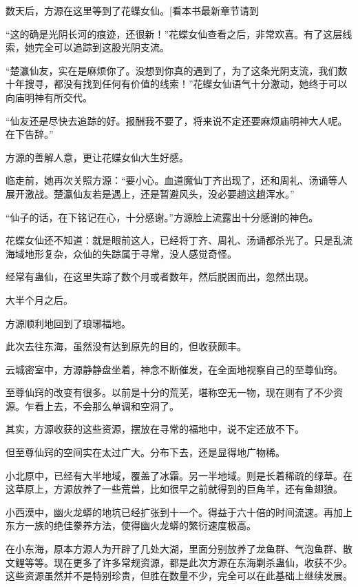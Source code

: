 
\begin{this_body}

数天后，方源在这里等到了花蝶女仙。[看本书最新章节请到

“这的确是光阴长河的痕迹，还很新！”花蝶女仙查看之后，非常欢喜。有了这层线索，她完全可以追踪到这股光阴支流。

“楚瀛仙友，实在是麻烦你了。没想到你真的遇到了，为了这条光阴支流，我们数十年搜寻，都没有找到任何有价值的线索！”花蝶女仙语气十分激动，她终于可以向庙明神有所交代。

“仙友还是尽快去追踪的好。报酬我不要了，将来说不定还要麻烦庙明神大人呢。在下告辞。”

方源的善解人意，更让花蝶女仙大生好感。

临走前，她再次关照方源：“要小心。血道魔仙丁齐出现了，还和周礼、汤诵等人展开激战。楚瀛仙友若是遇上，还是暂避风头，没必要趟这趟浑水。”

“仙子的话，在下铭记在心，十分感谢。”方源脸上流露出十分感谢的神色。

花蝶女仙还不知道：就是眼前这人，已经将丁齐、周礼、汤诵都杀光了。只是乱流海域地形复杂，众仙的失踪属于寻常，没人感觉奇怪。

经常有蛊仙，在这里失踪了数个月或者数年，然后脱困而出，忽然出现。

大半个月之后。

方源顺利地回到了琅琊福地。

此次去往东海，虽然没有达到原先的目的，但收获颇丰。

云城密室中，方源静静盘坐着，神念不断催发，在全面地视察自己的至尊仙窍。

至尊仙窍的改变有很多。以前是十分的荒芜，堪称空无一物，现在则有了不少资源。乍看上去，不会那么单调和空洞了。

其实，方源收获的这些资源，摆放在寻常的福地中，说不定还放不下。

但至尊仙窍的空间实在太过广大。分布下去，还是显得地广物稀。

小北原中，已经有大半地域，覆盖了冰霜。另一半地域。则是长着稀疏的绿草。在这草原上，方源放养了一些荒兽，比如很早之前就得到的巨角羊，还有鱼翅狼。

小西漠中，幽火龙蟒的地坑已经扩张到十一个。得益于六十倍的时间流速。再加上东方一族的绝佳豢养方法，使得幽火龙蟒的繁衍速度极高。

在小东海，原本方源人为开辟了几处大湖，里面分别放养了龙鱼群、气泡鱼群、散文鲤等等。现在更多了许多常规资源，都是此次方源在东海剿杀蛊仙，收获不少。这些资源虽然并不是特别珍贵，但胜在数量不少，完全可以在此基础上继续发展。


\end{this_body}
